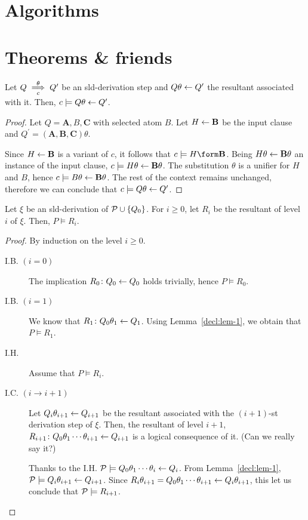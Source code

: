 \section{Algorithms}

\section{Theorems \& friends}

\begin{lem}
    \label{decl:lem-1}
    Let \(Q \underset{c}{\overset{\theta}{\implies}} Q^\prime\) be an \gls{sld}-derivation step and \(Q\theta \leftarrow Q^\prime\) the resultant associated with it.
    Then, \(c \models Q\theta \leftarrow Q^\prime\).
\end{lem}
\begin{proof}
    Let \(Q = \mathbf{A}, B, \mathbf{C}\) with selected atom \(B\). Let \(H \leftarrow \mathbf{B}\) be the input clause and \(Q^\prime = (\mathbf{A},\mathbf{B},\mathbf{C})\theta\).

    Since \(H \leftarrow \mathbf{B}\) is a variant of \(c\), it follows that \(c \models H \form \mathbf{B}\).
    Being \(H\theta \leftarrow \mathbf{B}\theta\) an instance of the input clause, \(c \models H\theta \leftarrow \mathbf{B}\theta\).
    The substitution \(\theta\) is a unifier for \(H\) and \(B\), hence \(c \models B\theta \leftarrow \mathbf{B}\theta\).
    The rest of the context remains unchanged, therefore we can conclude that \(c \models Q\theta \leftarrow Q^\prime\).
\end{proof}

\begin{lem}
    \label{decl:lem-2}
    Let \(\xi\) be an \gls{sld}-derivation of \(\mathcal{P} \cup \lbrace Q_0 \rbrace\).
    For \(i \ge 0\), let \(R_i\) be the resultant of level \(i\) of \(\xi\).
    Then, \(P \models R_i\).
\end{lem}
\begin{proof}
    By induction on the level \(i \ge 0\).
    \begin{description}
        \item[I.B. \((i = 0)\)] The implication \(R_0 \colon Q_0 \leftarrow Q_0\) holds trivially, hence \(P \models R_0\).
        \item[I.B. \((i = 1)\)] We know that \(R_1 \colon Q_0\theta_1 \leftarrow Q_1\). Using Lemma~\ref{decl:lem-1}, we obtain that \(P \models R_1\).
        \item[I.H.] Assume that \(P \models R_i\).
        \item[I.C. \((i \to i+1)\)] Let \(Q_i\theta_{i+1} \leftarrow Q_{i+1}\) be the resultant associated with the \((i+1)\)-st derivation step of \(\xi\).
        Then, the resultant of level \(i+1\), \(R_{i+1} \colon Q_0\theta_1\dotsb\theta_{i+1} \leftarrow Q_{i+1}\) is a logical consequence of it. (Can we really say it?)

        Thanks to the I.H. \(\mathcal{P} \models Q_0\theta_1\dotsb\theta_i \leftarrow Q_i\).
        From Lemma~\ref{decl:lem-1}, \(\mathcal{P} \models Q_i\theta_{i+1} \leftarrow Q_{i+1}\).
        Since \(R_i\theta_{i+1} = Q_0\theta_1\dotsb\theta_{i+1} \leftarrow Q_i\theta_{i+1}\), this let us conclude that \(\mathcal{P} \models R_{i+1}\). 
    \end{description}
\end{proof}

